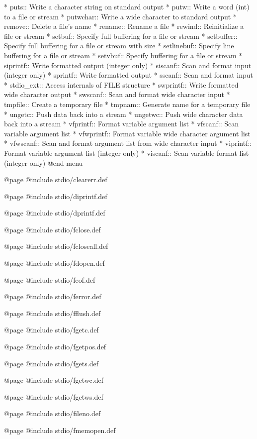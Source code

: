 * puts::        Write a character string on standard output
* putw::        Write a word (int) to a file or stream
* putwchar::    Write a wide character to standard output
* remove::      Delete a file's name
* rename::      Rename a file
* rewind::      Reinitialize a file or stream
* setbuf::      Specify full buffering for a file or stream
* setbuffer::   Specify full buffering for a file or stream with size
* setlinebuf::  Specify line buffering for a file or stream
* setvbuf::     Specify buffering for a file or stream
* siprintf::    Write formatted output (integer only)
* siscanf::     Scan and format input (integer only)
* sprintf::     Write formatted output
* sscanf::      Scan and format input
* stdio_ext::	Access internals of FILE structure
* swprintf::    Write formatted wide character output
* swscanf::     Scan and format wide character input
* tmpfile::     Create a temporary file
* tmpnam::      Generate name for a temporary file
* ungetc::      Push data back into a stream
* ungetwc::     Push wide character data back into a stream
* vfprintf::    Format variable argument list
* vfscanf::     Scan variable argument list
* vfwprintf::   Format variable wide character argument list
* vfwscanf::    Scan and format argument list from wide character input
* viprintf::    Format variable argument list (integer only)
* viscanf::     Scan variable format list (integer only)
@end menu

@page
@include stdio/clearerr.def

@page
@include stdio/diprintf.def

@page
@include stdio/dprintf.def

@page
@include stdio/fclose.def

@page
@include stdio/fcloseall.def

@page
@include stdio/fdopen.def

@page
@include stdio/feof.def

@page
@include stdio/ferror.def

@page
@include stdio/fflush.def

@page
@include stdio/fgetc.def

@page
@include stdio/fgetpos.def

@page
@include stdio/fgets.def

@page
@include stdio/fgetwc.def

@page
@include stdio/fgetws.def

@page
@include stdio/fileno.def

@page
@include stdio/fmemopen.def

